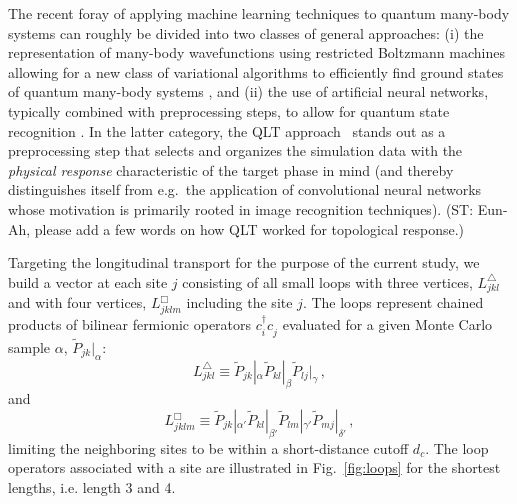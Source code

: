 \documentclass[amsmath,amssymb, aps, prx, longbibliography, twocolumn]{revtex4-1}
\begin{document}
The recent foray of applying machine learning techniques to quantum many-body systems can roughly be divided into two classes of general approaches: 
(i) the representation of many-body wavefunctions using restricted Boltzmann machines allowing for a new class of variational algorithms to efficiently find ground states of quantum many-body systems
\cite{Carleo2016, Deng2016, Deng2017, Glasser2018, Torlai2018, Gaoxun2017}, and 
(ii) the use of artificial neural networks, typically combined with preprocessing steps, to allow for quantum state recognition 
\cite{Melko20161, Nieuwenburg2017, LeiWang2016, Simon2016, Kelvin2016, Ohtsuki2016, Ohtsuki2017, Titus2017, qlt2016, FrankMLZ2, Broecker2017, ZhaiHui2017, Iakovlev2018, PollmannML2018, Anna2018}.
%
In the latter category, the QLT approach~\cite{qlt2016} stands out as a preprocessing step that selects and organizes the simulation data with the {\em physical response} characteristic of the target phase in mind (and thereby distinguishes itself from e.g.~the application of convolutional neural networks whose motivation is primarily rooted in image recognition techniques). 
{\color{red}(ST: Eun-Ah, please add a few words on how QLT worked for topological response.)}
%

Targeting the longitudinal transport for the purpose of the current study, we build a vector at each site $j$ consisting of all small loops with three vertices, $L^\triangle_{jkl}$ and with four vertices, $L^\Box_{jklm}$ including the site $j$. The loops represent
chained products of bilinear fermionic operators  $c_i^\dagger c_j^{\phantom\dagger}$ evaluated for a given Monte Carlo sample 
$\alpha$, $\widetilde{P}_{jk}|_{\alpha}$:
\begin{equation}
    L^\triangle_{jkl}\equiv\widetilde{P}_{jk}|_{\alpha} \widetilde{P}_{kl}|_{\beta} \widetilde{P}_{lj}|_{\gamma} \,,
    \label{eq:triangle}
\end{equation}
and 
\begin{equation}
L^\Box_{jklm}\equiv\widetilde{P}_{jk}|_{\alpha'} \widetilde{P}_{kl}|_{\beta'} \widetilde{P}_{lm}|_{\gamma'} \widetilde{P}_{mj}|_{\delta'} \,,
\label{eq:quad}
\end{equation}
limiting the neighboring sites to be within a short-distance cutoff $d_c$. 
The loop operators associated with a site are illustrated in Fig.~\ref{fig:loops} for the shortest lengths, i.e. length 3 and 4.
\end{document}
